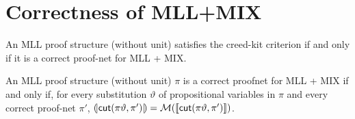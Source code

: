 \section{Correctness of MLL+MIX}


\begin{theorem}
    An MLL proof structure (without unit) satisfies the creed-kit criterion if and only if it is a correct proof-net for MLL + MIX.
\end{theorem}


\begin{theorem}
    An MLL proof structure (without unit) \( \pi \) is a correct proofnet for MLL + MIX if and only if, for every substitution \( \vartheta \) of propositional variables in \( \pi \) and every correct proof-net \( \pi' \), \( (\!|{\mathsf{cut}(\pi\vartheta, \pi')}|\!) = \mathcal{M}({\llbracket{\mathsf{cut}(\pi\vartheta, \pi')}\rrbracket}) \). 
\end{theorem}

